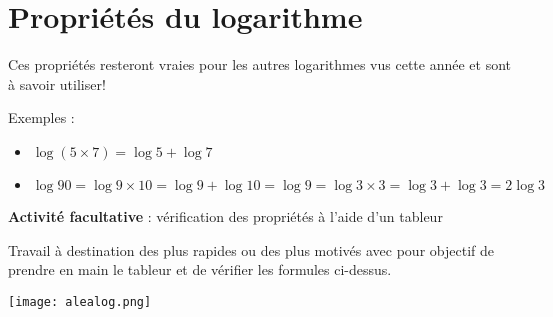 \documentclass[12pt,a4paper,oneside,dvipsnames,table,svgnames,skins,theorems]{report}
\begin{document}
\newpage

\section{Propriétés du logarithme}

Ces propriétés resteront vraies pour les autres logarithmes vus cette année et sont à savoir utiliser!

\vspace{0.5cm}

\begin{large}
\end{large}

\vspace{0.5cm}

Exemples :
\begin{itemize}
\item $\log(5\times7) = \log 5 + \log 7$
\item $\log 90 = \log 9\times 10 = \log 9 + \log 10 = \log 9 = \log 3 \times 3 = \log 3 + \log 3 = 2\log 3$
\end{itemize}

\vspace{1cm}

\textbf{Activité facultative} : vérification des propriétés à l'aide d'un tableur
\vspace{0.5cm}

Travail à destination des plus rapides ou des plus motivés avec pour objectif de prendre en main le tableur et de vérifier les formules ci-dessus.
\begin{center}
\texttt{[image: alealog.png]}
\end{center}
\end{document}
